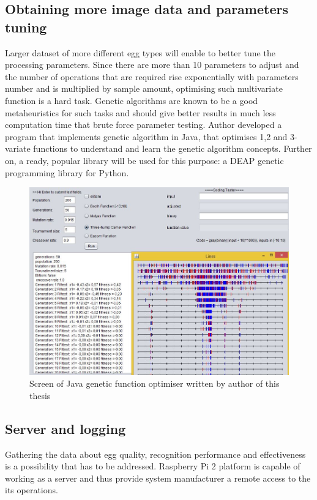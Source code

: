 \documentclass[12pt,twoside,a4paper]{article}
\begin{document}
\subsection{Obtaining more image data and parameters tuning}

Larger dataset of more different egg types will enable to better tune the processing parameters.
Since there are more than 10 parameters to adjust and the number of operations that are required rise exponentially with parameters number and is multiplied by sample amount, optimising such multivariate function is a hard task.
Genetic algorithms are known to be a good metaheuristics for such tasks and should give better results in much less computation time that brute force parameter testing.
Author developed a program that implements genetic algorithm in Java, that optimises 1,2 and 3-variate functions to understand and learn the genetic algorithm concepts.
Further on, a ready, popular library will be used for this purpose: a DEAP genetic programming library for Python.


\begin{figure}[H]
\centering
\includegraphics[width=0.7\paperwidth]{genetic}
\caption{Screen of Java genetic function optimiser written by author of this thesis \cite{morph}}\label{fig:generic}
\end{figure}


\subsection{Server and logging}
Gathering the data about egg quality, recognition performance and effectiveness is a possibility that has to be addressed.
Raspberry Pi 2 platform is capable of working as a server and thus provide system manufacturer a remote access to the its operations.
\end{document}
